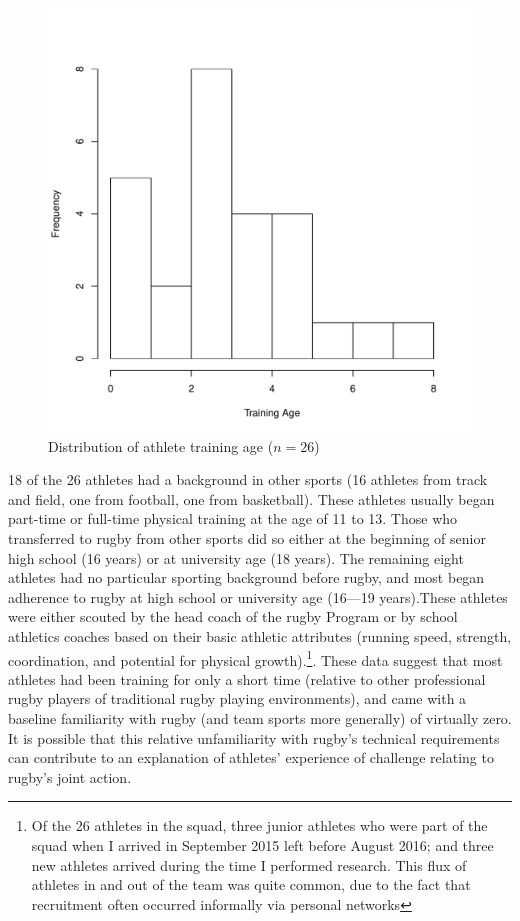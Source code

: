 \begin{CJK}{UTF8}{gbsn}
      \begin{figure}[htbp]
       \begin{center}
       \includegraphics[scale=.3]{images/ethnoTrainingAgeHist.pdf}
         \caption{Distribution of athlete training age ($n = 26$)}
       \end{center}
         \label{fig:ethnoTrainingAgeHist}
      \end{figure}


18 of the 26 athletes had a background in other sports (16 athletes from track and field, one from football, one from basketball).  These athletes usually began part-time or full-time physical training at the age of 11 to 13.  Those who transferred to rugby from other sports did so either at the beginning of senior high school (16 years) or at university age (18 years).  The remaining eight athletes had no particular sporting background before rugby, and most began adherence to rugby at high school or university age (16---19 years).These athletes were either scouted by the head coach of the rugby Program or by school athletics coaches based on their basic athletic attributes (running speed, strength, coordination, and potential for physical growth).\footnote{Of the 26 athletes in the squad, three junior athletes who were part of the squad when I arrived in September 2015 left before August 2016; and three new athletes arrived during the time I performed research.  This flux of athletes in and out of the team was quite common, due to the fact that recruitment often occurred informally via personal networks}.
These data suggest that most athletes had been training for only a short time (relative to other professional rugby players of traditional rugby playing environments), and came with a baseline familiarity with rugby (and team sports more generally) of virtually zero.  It is possible that this relative unfamiliarity with rugby's technical requirements can contribute to an explanation of athletes' experience of challenge relating to rugby's joint action.


\end{CJK}
